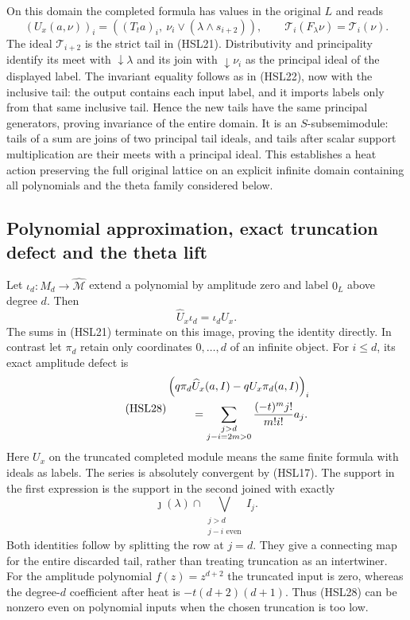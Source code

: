 On this domain the completed formula has values in the
original $L$ and reads
\begin{equation}\tag{HSL26}
 (U_x(a,\nu))_i
  =\left((T_ta)_i,\ \nu_i\vee(\lambda\wedge s_{i+2})\right),
 \qquad
 \mathcal T_i(F_\lambda\nu)=\mathcal T_i(\nu).
\end{equation}
The ideal $\mathcal T_{i+2}$ is the strict tail in (HSL21).
Distributivity and principality identify its meet with
$\downarrow\lambda$ and its join with $\downarrow\nu_i$
as the principal ideal of the displayed label.
The invariant equality follows as in (HSL22), now with the
inclusive tail: the output contains each input label,
and it imports labels only from that same inclusive tail.
Hence the new tails have the same principal generators,
proving invariance of the entire domain.
It is an $S$-subsemimodule: tails of a sum are joins of
two principal tail ideals, and tails after scalar support
multiplication are their meets with a principal ideal.
This establishes a heat action preserving the full original
lattice on an explicit infinite domain containing all
polynomials and the theta family considered below.

\subsection{Polynomial approximation, exact truncation defect and the theta lift}

Let $\iota_d:M_d\to\widehat{\mathcal M}$ extend a polynomial
by amplitude zero and label $0_L$ above degree $d$.
Then
\begin{equation}\tag{HSL27}
 \widehat U_x\iota_d=\iota_d U_x .
\end{equation}
The sums in (HSL21) terminate on this image, proving the
identity directly. In contrast let $\pi_d$ retain only
coordinates $0,\ldots,d$ of an infinite object. For $i\le d$,
its exact amplitude defect is
\begin{equation}\tag{HSL28}
 \begin{split}
 &\left(q\pi_d\widehat U_x(a,I)
           -q U_x\pi_d(a,I)\right)_i\\
 &\hspace{8mm}=
   \sum_{\substack{j>d\\j-i=2m>0}}
             \frac{(-t)^m j!}{m!i!}a_j .
 \end{split}
\end{equation}
Here $U_x$ on the truncated completed module means the same
finite formula with ideals as labels. The series is
absolutely convergent by (HSL17). The support in the first
expression is the support in the second joined with exactly
\begin{equation}\tag{HSL29}
 \jmath(\lambda)\cap
       \bigvee_{\substack{j>d\\j-i\text{ even}}}I_j .
\end{equation}
Both identities follow by splitting the row at $j=d$.
They give a connecting map for the entire discarded tail,
rather than treating truncation as an intertwiner.
For the amplitude polynomial $f(z)=z^{d+2}$ the truncated
input is zero, whereas the degree-$d$ coefficient after
heat is $-t(d+2)(d+1)$. Thus (HSL28) can be nonzero even
on polynomial inputs when the chosen truncation is too low.

